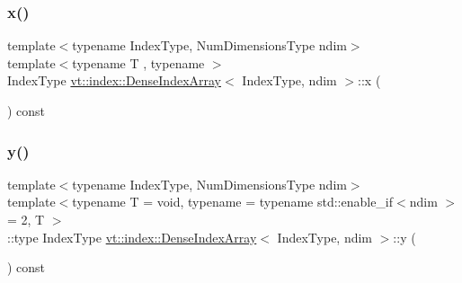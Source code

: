 \mbox{\label{structvt_1_1index_1_1_dense_index_array_af5731c29e392485535d090b57b66a6f5}} 
\subsubsection{\texorpdfstring{x()}{x()}\hspace{0.1cm}{\footnotesize\ttfamily [2/2]}}
{\footnotesize\ttfamily template$<$typename Index\+Type, Num\+Dimensions\+Type ndim$>$ \\
template$<$typename T , typename $>$ \\
Index\+Type \hyperlink{structvt_1_1index_1_1_dense_index_array}{vt\+::index\+::\+Dense\+Index\+Array}$<$ Index\+Type, ndim $>$\+::x (\begin{DoxyParamCaption}{ }\end{DoxyParamCaption}) const}

\mbox{\label{structvt_1_1index_1_1_dense_index_array_a6f150c2dbed44d633b4dc3b62aea2c9b}} 
\subsubsection{\texorpdfstring{y()}{y()}\hspace{0.1cm}{\footnotesize\ttfamily [1/2]}}
{\footnotesize\ttfamily template$<$typename Index\+Type, Num\+Dimensions\+Type ndim$>$ \\
template$<$typename T  = void, typename  = typename std\+::enable\+\_\+if$<$ndim $>$= 2, T $>$ \\
\+::type Index\+Type \hyperlink{structvt_1_1index_1_1_dense_index_array}{vt\+::index\+::\+Dense\+Index\+Array}$<$ Index\+Type, ndim $>$\+::y (\begin{DoxyParamCaption}{ }\end{DoxyParamCaption}) const}

\mbox{\label{structvt_1_1index_1_1_dense_index_array_a23d6673153f284a46bad6e1be6781e08}} 
